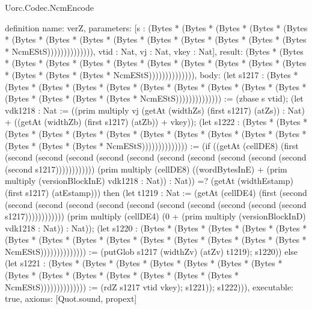 \begin{lexlean}{Uorc.Codec.NcmEncode}
\begin{semanticmodule}
definition{
  name: verZ,
  parameters: [s : (Bytes * (Bytes * (Bytes * (Bytes * (Bytes * (Bytes * (Bytes * (Bytes * (Bytes * (Bytes * (Bytes * (Bytes * (Bytes * (Bytes * NcmEStS)))))))))))))), vtid : Nat, vj : Nat, vkey : Nat],
  result: (Bytes * (Bytes * (Bytes * (Bytes * (Bytes * (Bytes * (Bytes * (Bytes * (Bytes * (Bytes * (Bytes * (Bytes * (Bytes * (Bytes * NcmEStS)))))))))))))),
  body: (let s1217 : (Bytes * (Bytes * (Bytes * (Bytes * (Bytes * (Bytes * (Bytes * (Bytes * (Bytes * (Bytes * (Bytes * (Bytes * (Bytes * (Bytes * NcmEStS)))))))))))))) := (zbase s vtid); (let vdk1218 : Nat := ((prim multiply vj (getAt (widthZs) (first s1217) (atZs)) : Nat) + ((getAt (widthZb) (first s1217) (atZb)) + vkey)); (let s1222 : (Bytes * (Bytes * (Bytes * (Bytes * (Bytes * (Bytes * (Bytes * (Bytes * (Bytes * (Bytes * (Bytes * (Bytes * (Bytes * (Bytes * NcmEStS)))))))))))))) := (if ((getAt (cellDE8) (first (second (second (second (second (second (second (second (second (second (second (second s1217)))))))))))) (prim multiply (cellDE8) ((wordBytesInE) + (prim multiply (versionBlockInE) vdk1218 : Nat)) : Nat)) =? (getAt (widthEstamp) (first s1217) (atEstamp))) then (let t1219 : Nat := (getAt (cellDE4) (first (second (second (second (second (second (second (second (second (second (second (second s1217)))))))))))) (prim multiply (cellDE4) (0 + (prim multiply (versionBlockInD) vdk1218 : Nat)) : Nat)); (let s1220 : (Bytes * (Bytes * (Bytes * (Bytes * (Bytes * (Bytes * (Bytes * (Bytes * (Bytes * (Bytes * (Bytes * (Bytes * (Bytes * (Bytes * NcmEStS)))))))))))))) := (putGlob s1217 (widthZv) (atZv) t1219); s1220)) else (let s1221 : (Bytes * (Bytes * (Bytes * (Bytes * (Bytes * (Bytes * (Bytes * (Bytes * (Bytes * (Bytes * (Bytes * (Bytes * (Bytes * (Bytes * NcmEStS)))))))))))))) := (rdZ s1217 vtid vkey); s1221)); s1222))),
  executable: true,
  axioms: [Quot.sound, propext]
}


\end{semanticmodule}
\end{lexlean}
